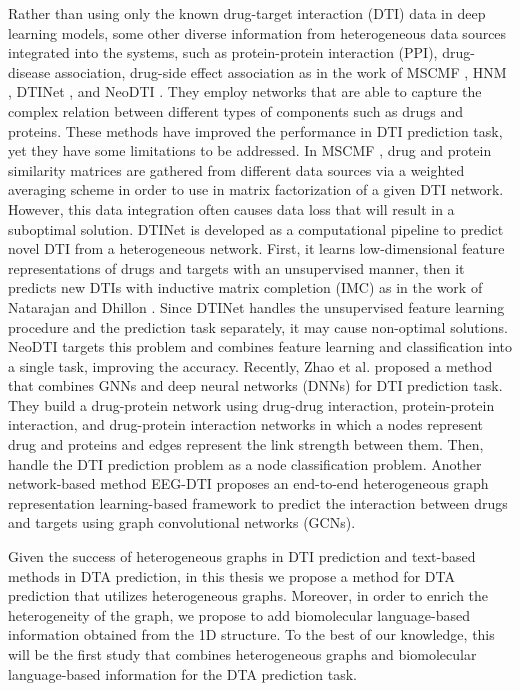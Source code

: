 Rather than using only the known drug-target interaction (DTI) data in deep learning models, some other diverse information from heterogeneous data sources integrated into the systems, such as protein-protein interaction (PPI), drug-disease association, drug-side effect association as in the work of MSCMF \cite{zheng2013collaborative}, HNM \cite{wang2014drug}, DTINet \cite{luo2017network}, and NeoDTI \cite{wan2018neodti}. They employ networks that are able to capture the complex relation between different types of components such as drugs and proteins. These methods have improved the performance in DTI prediction task, yet they have some limitations to be addressed. In MSCMF \cite{zheng2013collaborative}, drug and protein similarity matrices are gathered from different data sources via a weighted averaging scheme in order to use in matrix factorization of a given DTI network. However, this data integration often causes data loss that will result in a suboptimal solution. DTINet \cite{luo2017network} is developed as a computational pipeline to predict novel DTI from a heterogeneous network. First, it learns low-dimensional feature representations of drugs and targets with an unsupervised manner, then it predicts new DTIs with inductive matrix completion (IMC) as in the work of Natarajan and Dhillon \cite{natarajan2014inductive}. Since DTINet handles the unsupervised feature learning procedure and the prediction task separately, it may cause non-optimal solutions. NeoDTI \cite{wan2018neodti} targets this problem and combines feature learning and classification into a single task, improving the accuracy. Recently, Zhao et al. \cite{zhao2021identifying} proposed a method that combines GNNs and deep neural networks (DNNs) for DTI prediction task. They build a drug-protein network using drug-drug interaction, protein-protein interaction, and drug-protein interaction networks in which a nodes represent drug and proteins and edges represent the link strength between them. Then, handle the DTI prediction problem as a node classification problem. Another network-based method EEG-DTI \cite{peng2021end} proposes an end-to-end heterogeneous graph representation learning-based framework to predict the interaction between drugs and targets using graph convolutional networks (GCNs). 

Given the success of heterogeneous graphs in DTI prediction and text-based methods in DTA prediction, in this thesis we propose a method for DTA prediction that utilizes heterogeneous graphs. Moreover, in order to enrich the heterogeneity of the graph, we propose to add biomolecular language-based information obtained from the 1D structure. To the best of our knowledge, this will be the first study that combines heterogeneous graphs and biomolecular language-based information for the DTA prediction task. 